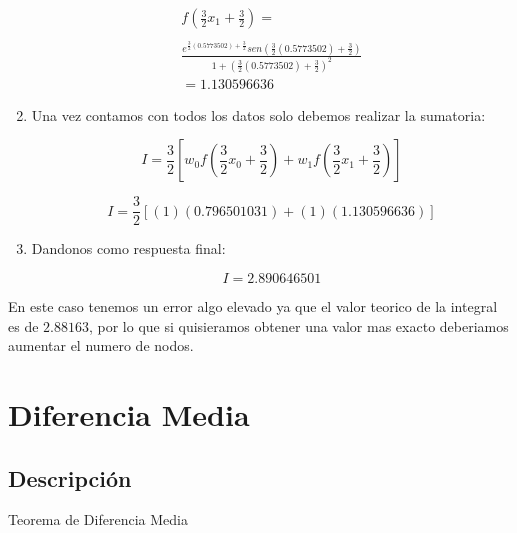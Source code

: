 \documentclass[journal,transmag]{IEEEtran}
\theoremstyle{mytheoremstyle}
\theoremstyle{mytheoremstyle}
\theoremstyle{myproblemstyle}
\begin{document}
\begin{enumerate}
                            \begin{multline*}
                        f(\frac{3}{2}x_1+\frac{3}{2})=\\
                        \\
                        \frac{e^{\frac{3}{2}(0.5773502)+\frac{3}{2}}sen(\frac{3}{2}(0.5773502)+\frac{3}{2})}{1+(\frac{3}{2}(0.5773502)+\frac{3}{2})^2}\\
                        =1.130596636
                    \end{multline*}
                    
                    \item Una vez contamos con todos los datos solo debemos realizar la sumatoria:
                    
                    \begin{equation*}
                        I=\frac{3}{2}[w_0f(\frac{3}{2}x_0+\frac{3}{2})+w_1f(\frac{3}{2}x_1+\frac{3}{2})]
                    \end{equation*}
                    
                    \begin{equation*}
                        I=\frac{3}{2}[(1)(0.796501031)+(1)(1.130596636)]
                    \end{equation*}
                    
                    \item Dandonos como respuesta final:
                    
                            
                    \begin{equation*}
                        I=2.890646501
                    \end{equation*}
                    
                \end{enumerate}
                
                En este caso tenemos un error algo elevado ya que el valor teorico de la integral es de $2.88163$, por lo que si quisieramos obtener una valor mas exacto deberiamos aumentar el numero de nodos.
            
\section{Diferencia Media}
\subsection{Descripción}
\begin{lipsum}
    Teorema de Diferencia Media
\end{lipsum}
\end{document}
